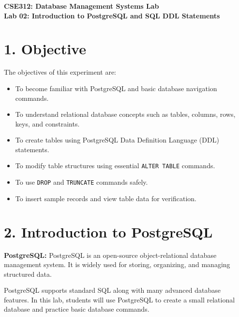 \documentclass[12pt,a4paper]{article}
\newcommand{\defbox}[2]{%
  \vspace{0.2cm}
  \noindent\colorbox{boxgray}{\parbox{\dimexpr\linewidth-2\fboxsep}{%
    \textbf{#1:} #2
  }}
  \vspace{0.2cm}
}
\begin{document}
\begin{center}
    {\Large \textbf{CSE312: Database Management Systems Lab}}\\[0.3cm]
    {\large \textbf{Lab 02: Introduction to PostgreSQL and SQL DDL Statements}}
\end{center}

\vspace{0.5cm}

\section*{1. Objective}
The objectives of this experiment are:
\begin{itemize}
    \item To become familiar with PostgreSQL and basic database navigation commands.
    \item To understand relational database concepts such as tables, columns, rows, keys, and constraints.
    \item To create tables using PostgreSQL Data Definition Language (DDL) statements.
    \item To modify table structures using essential \texttt{ALTER TABLE} commands.
    \item To use \texttt{DROP} and \texttt{TRUNCATE} commands safely.
    \item To insert sample records and view table data for verification.
\end{itemize}

\section*{2. Introduction to PostgreSQL}
\defbox{PostgreSQL}{PostgreSQL is an open-source object-relational database management system. It is widely used for storing, organizing, and managing structured data.}

PostgreSQL supports standard SQL along with many advanced database features. In this lab, students
will use PostgreSQL to create a small relational database and practice basic database commands.
\end{document}
